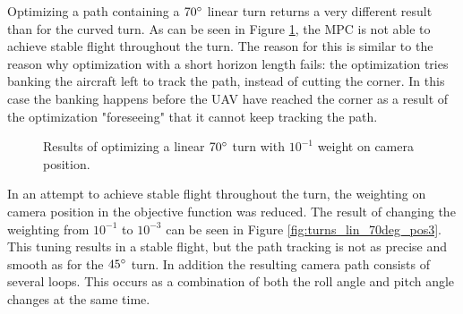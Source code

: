 Optimizing a path containing a $70\degree$ linear turn returns a very different result than for the curved turn. As can be seen in Figure \ref{fig:turns_lin_70deg_pos1}, the MPC is not able to achieve stable flight throughout the turn. The reason for this is similar to the reason why optimization with a short horizon length fails: the optimization tries banking the aircraft left to track the path, instead of cutting the corner. In this case the banking happens before the UAV have reached the corner as a result of the optimization "foreseeing" that it cannot keep tracking the path.

\begin{figure}
	\caption{Results of optimizing a linear $70\degree$ turn with $10^{-1}$ weight on camera position.}
	\label{fig:turns_lin_70deg_pos1}
\end{figure}

In an attempt to achieve stable flight throughout the turn, the weighting on camera position in the objective function was reduced. The result of changing the weighting from $10^{-1}$ to $10^{-3}$ can be seen in Figure \ref{fig:turns_lin_70deg_pos3}. This tuning results in a stable flight, but the path tracking is not as precise and smooth as for the $45\degree$ turn. In addition the resulting camera path consists of several loops. This occurs as a combination of both the roll angle and pitch angle changes at the same time.

